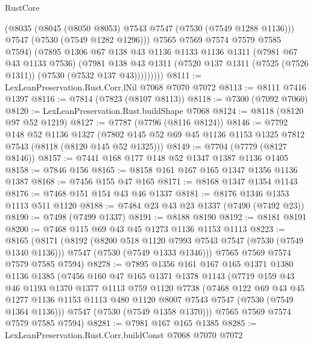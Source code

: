 \begin{lexlean}{RustCore}
\begin{coremodule}
              (@8035
                (@8045 (@8050 @8053) @7543 @7547 (@7530 (@7549 @1288 @1136)))
                @7547
                (@7530 (@7549 @1282 @1296)))
              @7565
              @7569
              @7574
              @7579
              @7585
              @7594)
            (@7895
              @1306
              @67
              @138
              @43
              @1136
              @1133
              @1136
              @1311
              (@7981 @67 @43 @1133 @7536)
              (@7981
                @138
                @43
                @1311
                (@7520 @137 @1311 (@7525 (@7526 @1311)) (@7530 (@7532 @137 @43)))))))))
@8111 := LexLeanPreservation.Rust.Corr.lNil @7068 @7070 @7072
@8113 := @8111 @7416 @1397
@8116 := @7814 (@7823 (@8107 @8113))
@8118 := @7300 (@7092 @7060)
@8120 := LexLeanPreservation.Rust.buildShape @7068
@8124 := @8118 (@8120 @97 @52 @1219)
@8127 := @7787 (@7796 (@8116 @8124))
@8146 := @7792
    @148
    @52
    @1136
    @1327
    (@7802 @145 @52 @69 @45 @1136 @1153 @1325 @7812 @7543 (@8118 (@8120 @145 @52 @1325)))
@8149 := @7704 (@7779 (@8127 @8146))
@8157 := @7441 @168 @177 @148 @52 @1347 @1387 @1136 @1405
@8158 := @7846 @156
@8165 := @8158 @161 @167 @165 @1347 @1356 @1136 @1387
@8168 := @7456 @155 @47 @165
@8171 := @8168 @1347 @1354 @1143
@8176 := @7468 @151 @154 @43 @46 @1337
@8181 := @8176 @1346 @1353 @1113 @511 @1120
@8188 := @7484 @23 @43 @23 @1337 (@7490 (@7492 @23))
@8190 := @7498 (@7499 @1337)
@8191 := @8188 @8190
@8192 := @8181 @8191
@8200 := @7468 @115 @69 @43 @45 @1273 @1136 @1153 @1113
@8223 := @8165
    (@8171
      (@8192
        (@8200 @518 @1120 @7993 @7543 @7547 (@7530 (@7549 @1340 @1136)))
        @7547
        (@7530 (@7549 @1333 @1346)))
      @7565
      @7569
      @7574
      @7579
      @7585
      @7594)
@8278 := @7895
    @1356
    @161
    @167
    @165
    @1371
    @1380
    @1136
    @1385
    (@7456
      @160
      @47
      @165
      @1371
      @1378
      @1143
      (@7719
        @159
        @43
        @46
        @1193
        @1370
        @1377
        @1113
        @759
        @1120
        @7738
        (@7468
          @122
          @69
          @43
          @45
          @1277
          @1136
          @1153
          @1113
          @480
          @1120
          @8007
          @7543
          @7547
          (@7530 (@7549 @1364 @1136)))
        @7547
        (@7530 (@7549 @1358 @1370)))
      @7565
      @7569
      @7574
      @7579
      @7585
      @7594)
@8281 := @7981 @167 @165 @1385
@8285 := LexLeanPreservation.Rust.Corr.buildConst @7068 @7070 @7072

\end{coremodule}
\end{lexlean}
